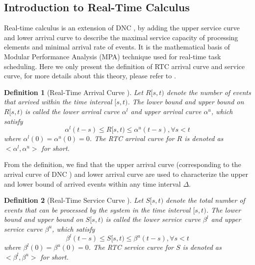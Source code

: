 \documentclass[10pt,journal]{IEEEtran}
\newtheorem{definition}{Definition}
\begin{document}
\subsection{Introduction to Real-Time Calculus}\label{intrortc}
Real-time calculus is an extension of DNC \cite{1253607}, by adding the upper service curve and lower arrival curve to describe the maximal service capacity of processing elements and minimal arrival rate of events. It is the mathematical basis of Modular Performance Analysis (MPA) \cite{Wandeler2006System} technique used for real-time task scheduling. Here we only present the definition of RTC arrival curve and service curve, for more details about this theory, please refer to \cite{1253607}.
\begin{definition}[Real-Time Arrival Curve \cite{1253607}]
Let $R[s,t)$ denote the number of events that arrived within the time interval $[s,t)$. The lower bound and upper bound on $R[s,t)$ is called the lower arrival curve $\alpha^l$ and upper arrival curve $\alpha^u$, which satisfy
$$\alpha^l(t-s)\leq R[s,t)\leq \alpha^u(t-s),\forall s<t$$
where $\alpha^l(0)=\alpha^u(0)=0$. The RTC arrival curve for $R$ is denoted as $<\alpha^l,\alpha^u>$ for short.
\end{definition}

From the definition, we find that the upper arrival curve (corresponding to the arrival curve of DNC \cite{Boudec2001Network}) and lower arrival curve are used to characterize the upper and lower bound of arrived events within any time interval $\Delta$.

\begin{definition}[Real-Time Service Curve \cite{1253607}]
Let $S[s,t)$ denote the total number of events that can be processed by the system in the time interval $[s,t)$. The lower bound and upper bound on $S[s,t)$ is called the lower service curve $\beta^l$ and upper service curve $\beta^u$, which satisfy
$$\beta^l(t-s)\leq S[s,t)\leq \beta^u(t-s),\forall s<t$$
where $\beta^l(0)=\beta^u(0)=0$. The RTC service curve for $S$ is denoted as $<\beta^l,\beta^u>$ for short.
\end{definition}
\end{document}
